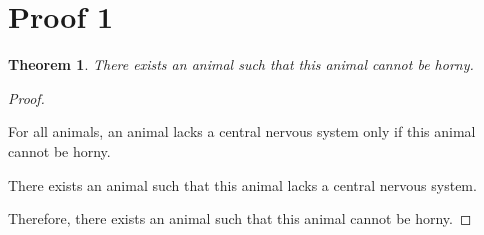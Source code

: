 \documentclass{article}
\newtheorem{thm}{Theorem}
\begin{document}
\section{Proof 1}
\begin{thm}
	There exists an animal such that this animal cannot be horny.
\end{thm}
\begin{proof}
${}$

For all animals, an animal lacks a central nervous system only if this animal cannot be horny.

There exists an animal such that this animal lacks a central nervous system.

Therefore, there exists an animal such that this animal cannot be horny.
\end{proof}
\end{document}
